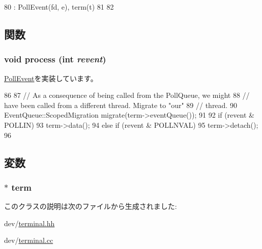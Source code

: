 \begin{DoxyCode}
80     : PollEvent(fd, e), term(t)
81 {
82 }
\end{DoxyCode}


\subsection{関数}
\hypertarget{classTerminal_1_1DataEvent_aedacbaeee0c89ceca526874c34f6b20b}{
\subsubsection[{process}]{\setlength{\rightskip}{0pt plus 5cm}void process (int {\em revent})}}
\label{classTerminal_1_1DataEvent_aedacbaeee0c89ceca526874c34f6b20b}


\hyperlink{classPollEvent_a8b870dc0eeb339499d64aa56fc0e2aa5}{PollEvent}を実装しています。


\begin{DoxyCode}
86 {
87     // As a consequence of being called from the PollQueue, we might
88     // have been called from a different thread. Migrate to "our"
89     // thread.
90     EventQueue::ScopedMigration migrate(term->eventQueue());
91 
92     if (revent & POLLIN)
93         term->data();
94     else if (revent & POLLNVAL)
95         term->detach();
96 }
\end{DoxyCode}


\subsection{変数}
\hypertarget{classTerminal_1_1DataEvent_a61b35a33209eb5f0de1f6f97f543ef92}{
\subsubsection[{term}]{$\ast$ {\bf term}}}
\label{classTerminal_1_1DataEvent_a61b35a33209eb5f0de1f6f97f543ef92}


このクラスの説明は次のファイルから生成されました:\begin{DoxyCompactItemize}
\item 
dev/\hyperlink{terminal_8hh}{terminal.hh}\item 
dev/\hyperlink{terminal_8cc}{terminal.cc}\end{DoxyCompactItemize}
